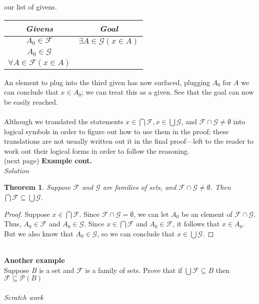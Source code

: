\documentclass{report}
\newtheorem*{theorem}{Theorem}
\theoremstyle{definition}
\begin{document}
our list of givens.
\begin{center}
\begin{tabular}{c|c}
\textit{Givens}&\textit{Goal}\\
\hline
$A_0\in\mathcal F$&$\exists A\in\mathcal G(x\in A)$\\
$A_0\in\mathcal G$&\\
$\forall A\in\mathcal F(x\in A)$&
\end{tabular}
\end{center}
An element to plug into the third given has now surfaced, plugging $A_0$ for $A$ we can conclude that $x\in A_0$; we can treat this as a given. See that the goal can now be easily reached.\\
\vspace{1mm}\\
Although we translated the statements $x\in\bigcap\mathcal F,x\in\bigcup\mathcal G$, and $\mathcal F\cap\mathcal G\neq\emptyset$ into logical symbols in order to figure out how to use
them in the proof; these translations are not usually written out it in the final proof---left to the reader to work out their logical forms in order to follow the reasoning.\\
(next page)\newpage
\noindent\textbf{Example cont.}\\
\textit{Solution}
\begin{theorem}
Suppose $\mathcal F$ and $\mathcal G $ are families of sets, and $\mathcal F\cap\mathcal G\neq\emptyset$. Then\\$\bigcap\mathcal F\subseteq\bigcup\mathcal G$.
\end{theorem}
\begin{proof}
Suppose $x\in\bigcap\mathcal F$. Since $\mathcal F\cap\mathcal G=\emptyset$, we can let $A_0$ be an element of $\mathcal F\cap\mathcal G$. Thus, $A_0\in\mathcal F$ and $A_0\in\mathcal G$. Since
$x\in\bigcap\mathcal F$ and $A_0\in\mathcal F$, it follows that $x\in A_0$. But we also know that $A_0\in\mathcal G$, so we can conclude that $x\in\bigcup\mathcal G$.
\end{proof}
\hspace{1mm}\\
\noindent\textbf{Another example}\\
Suppose $B$ is a set and $\mathcal F$ is a family of sets. Prove that if $\bigcup\mathcal F\subseteq B$ then $\mathcal F\subseteq\mathscr P(B)$\\
\vspace{1mm}\\
\textit{Scratch work}\\
\end{document}
